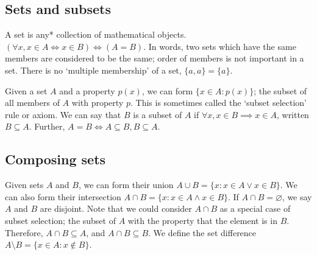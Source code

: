 \subsection{Sets and subsets}
A set is any* collection of mathematical objects.
\((\forall x, x \in A \iff x \in B) \iff (A = B)\).
In words, two sets which have the same members are considered to be the same; order of members is not important in a set.
There is no `multiple membership' of a set, \(\{ a, a \} = \{ a \}\).

Given a set \(A\) and a property \(p(x)\), we can form \(\{ x \in A: p(x) \}\); the subset of all members of \(A\) with property \(p\).
This is sometimes called the `subset selection' rule or axiom.
We can say that \(B\) is a subset of \(A\) if \(\forall x, x \in B \implies x \in A\), written \(B \subseteq A\).
Further, \(A = B \iff A \subseteq B, B \subseteq A\).

\subsection{Composing sets}
Given sets \(A\) and \(B\), we can form their union \(A \cup B = \{ x: x \in A \lor x \in B \}\).
We can also form their intersection \(A \cap B = \{ x: x \in A \wedge x \in B \}\).
If \(A \cap B = \varnothing\), we say \(A\) and \(B\) are disjoint.
Note that we could consider \(A \cap B\) as a special case of subset selection; the subset of \(A\) with the property that the element is in \(B\).
Therefore, \(A \cap B \subseteq A\), and \(A \cap B \subseteq B\).
We define the set difference \(A \setminus B = \{ x \in A: x \notin B \}\).

